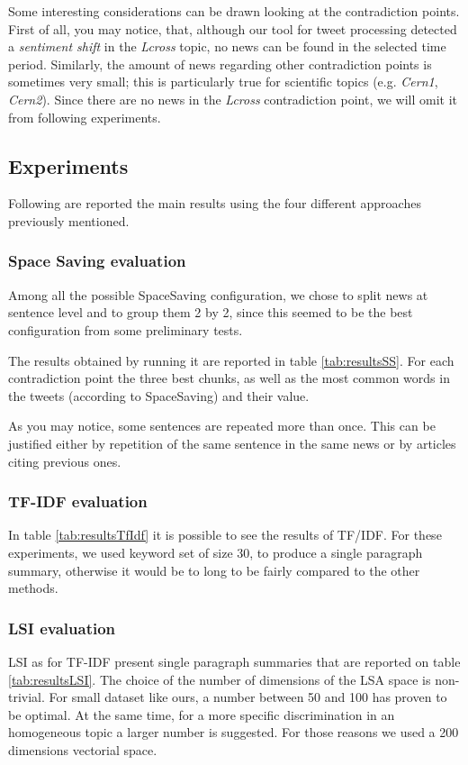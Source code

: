 Some interesting considerations can be drawn looking at the contradiction points.
First of all, you may notice, that, although our tool for tweet processing detected a \emph{sentiment
shift} in the \emph{Lcross} topic, no news can be found in the selected time period.
Similarly, the amount of news regarding other contradiction points is sometimes
very small; this is particularly true for scientific topics (e.g. \emph{Cern1},
\emph{Cern2}).
Since there are no news in the \emph{Lcross} contradiction point, we will omit it from following
experiments.

\subsection*{Experiments}
Following are reported the main results using the four different approaches previously mentioned.
\subsubsection*{Space Saving evaluation}
Among all the possible SpaceSaving configuration, we chose to split news at
sentence level and to group them 2 by 2, since this seemed to be the best
configuration from some preliminary tests.

The results obtained by running it are reported in table \ref{tab:resultsSS}. For
each contradiction point the three best chunks, as well as the most
common words in the tweets (according to SpaceSaving) and their value.

As you may notice, some sentences are repeated more than once. This can be
justified either by repetition of the same sentence in the same news or by
articles citing previous ones.

\subsubsection*{TF-IDF evaluation}
In table \ref{tab:resultsTfIdf} it is possible to see the results of TF/IDF. For these experiments, we used keyword set of size 30, to produce a single paragraph summary, otherwise it would be to long to be fairly compared to the other methods.

\subsubsection*{LSI evaluation}
LSI as for TF-IDF present single paragraph summaries that are reported on table \ref{tab:resultsLSI}. The choice of the number of dimensions of the LSA space is non-trivial. For small dataset like ours, a number between 50 and 100 has proven to be optimal\cite{LSA2}. At the same time, for a more specific discrimination in an homogeneous topic a larger number is suggested. For those reasons we used a 200 dimensions vectorial space.


